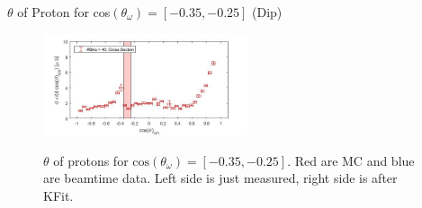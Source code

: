 \documentclass[
		10pt
		]{beamer}
\begin{document}
\begin{frame}{$ \theta$ of Proton for cos$(\theta_{\omega})=[-0.35,-0.25]$ (Dip)}
	
	\begin{figure}
		\hspace{0cm}  \vspace{-1cm}
		\includegraphics[width=6cm]{Plots/7}
	\end{figure}
	
	
	\begin{figure}%
		\centering
		\qquad
		\captionsetup{labelformat=empty}
		\caption{$\theta$ of protons for $\textrm{cos}(\theta_{\omega}) = [-0.35, -0.25] $. Red are MC and blue are beamtime data. Left side is just measured, right side is after KFit.}%
		\label{fig:example}%
	\end{figure}
	
\end{frame}
\end{document}
